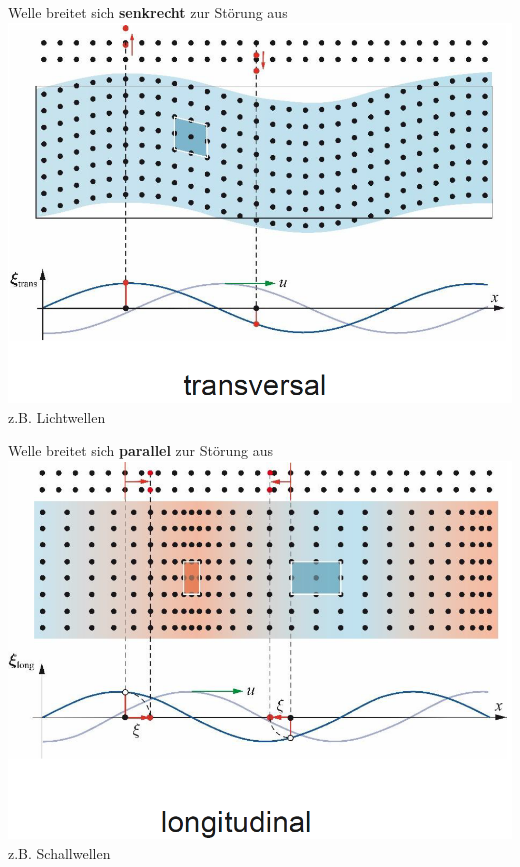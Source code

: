 \begin{minipage}{0.45\linewidth}
Welle breitet sich \textbf{senkrecht} zur Störung aus \\

\includegraphics[width=0.95\linewidth]{Bilder/Wellen-Optik/welle_transversal} \\
z.B. Lichtwellen
\end{minipage}
\hfill
\begin{minipage}{0.45\linewidth}
Welle breitet sich \textbf{parallel} zur Störung aus \\

\includegraphics[width=0.95\linewidth]{Bilder/Wellen-Optik/welle_longitudinal}\\
z.B. Schallwellen

\end{minipage}

